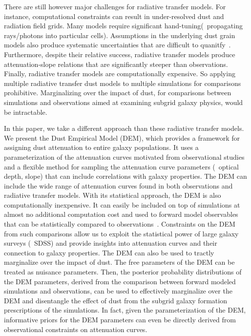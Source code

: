 There are still however major challenges for radiative transfer models. For instance,
computational constraints can result in under-resolved dust and radiation field
grids. Many models require significant hand-tuning(\eg~propagating rays/photons
into particular cells). Assumptions in the underlying dust grain models also
produce systematic uncertainties that are difficult to quanitfy~\citep[see][for
a review]{steinacker2013}. Furthermore, despite their relative success,
radiative transfer models produce attenuation-slope relations that are
significantly steeper than observations. Finally, radiative transfer models 
are computationally expensive. So applying multiple radiative transfer dust
models to multiple simulations for comparisons prohibitive. Marginalizing over
the impact of dust, for comparisons between simulations and observations aimed 
at examining subgrid galaxy physics, would be intractable. 

In this paper, we take a different approach than these radiative transfer
models. We present the Dust Empirical Model (DEM), which provides a framework for
assigning dust attenuation to entire galaxy populations. It uses a
parameterization of the attenuation curves motivated from observational
studies~\citep[\eg][]{noll2009} and a flexible method for sampling the
attenuation curve parameters (\eg~optical depth, slope) that can include
correlations with galaxy properties. The DEM can include the wide range of 
attenuation curves found in both observations and radiative transfer models. 
With its statistical approach, the DEM is also computationally inexpensive. 
It can easily be included on top of simulations at almost no additional 
computation cost and used to forward model observables that can be 
statistically compared to observations~\citep[\eg][]{nelson2018, baes2019,
trcka2020, dickey2020}. Constraints on the DEM from such comparisons allow us
to exploit the statistical power of large galaxy surveys (\eg~SDSS) and provide
insights into attenuation curves and their connection to galaxy properties.
The DEM can also be used to tractly marginalize over the impact of dust. The
free parameters of the DEM can be treated as nuisance parameters. Then, the
posterior probability distributions of the DEM parameters, derived from 
the comparison between forward modeled simulations and observations, can be 
used to effectively marginalize over the DEM and disentangle the effect of dust
from the subgrid galaxy formation prescriptions of the simulations. In fact,
given the parameterization of the DEM, informative priors for the DEM
parameters can even be directly derived from observational constraints on
attenuation curves. 

